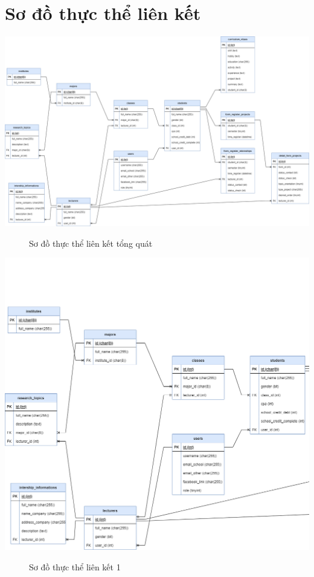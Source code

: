 \section{Sơ đồ thực thể liên kết}

    \begin{center}
      \includegraphics[width=1.1\textwidth]{../drawio/db_sv1.png}
      \begin{figure}[h]
        \centering
        \caption{Sơ đồ thực thể liên kết tổng quát}
      \end{figure}
    \end{center}
    \begin{center}
      \includegraphics[width=1.1\textwidth]{../drawio/db_sv2.png}
      \begin{figure}[h]
        \centering
        \caption{Sơ đồ thực thể liên kết 1}
      \end{figure}
    \end{center}
